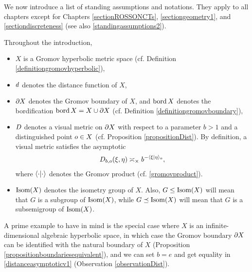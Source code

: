 We now introduce a list of standing assumptions and notations. They apply to all chapters except for Chapters \ref{sectionROSSONCTs}, \ref{sectiongeometry1}, and \ref{sectiondiscreteness} (see also \6\ref{standingassumptions2}).

\begin{notation}
\label{standingassumptions}
Throughout the introduction,
\begin{itemize}
\item $X$ is a Gromov hyperbolic metric space (cf. Definition \ref{definitiongromovhyperbolic}),
\item $d$ denotes the distance function of $X$,
\item $\partial X$ denotes the Gromov boundary of $X$, and $\operatorname{bord} X$ denotes the bordification $\operatorname{bord} X = X\cup \partial X$ (cf. Definition \ref{definitiongromovboundary}),
\item $D$ denotes a visual metric on $\partial X$ with respect to a parameter $b > 1$ and a distinguished point $o\in X$ (cf. Proposition \ref{propositionDist}). By definition, a visual metric satisfies the asymptotic
\begin{equation}
\label{distanceasymptoticv1}
D_{b,o}(\xi,\eta) \asymp_\times b^{-\langle\xi|\eta\rangle_o},
\end{equation}
where $\langle\cdot|\cdot\rangle$ denotes the Gromov product (cf. \eqref{gromovproduct}).
\item $\operatorname{Isom}(X)$ denotes the isometry group of $X$. Also, $G\leq\operatorname{Isom}(X)$ will mean that $G$ is a subgroup of $\operatorname{Isom}(X)$, while $G\preceq\operatorname{Isom}(X)$ will mean that $G$ is a subsemigroup of $\operatorname{Isom}(X)$.
\end{itemize}
\end{notation}

A prime example to have in mind is the special case where $X$ is an infinite-dimensional algebraic hyperbolic space, in which case the Gromov boundary $\partial X$ can be identified with the natural boundary of $X$ (Proposition \ref{propositionboundariesequivalent}), and we can set $b = e$ and get equality in \eqref{distanceasymptoticv1} (Observation \ref{observationDist}).

